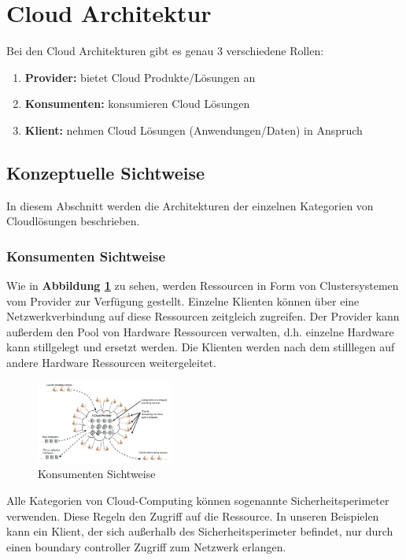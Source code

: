 \section{Cloud Architektur}

Bei den Cloud Architekturen gibt es genau 3 verschiedene Rollen:
\begin{enumerate}
	\item \textbf{Provider:} bietet Cloud Produkte/Lösungen an
	\item \textbf{Konsumenten:} konsumieren Cloud Lösungen
	\item \textbf{Klient:} nehmen Cloud Lösungen
	 (Anwendungen/Daten) in Anspruch
\end{enumerate}

\subsection{Konzeptuelle Sichtweise}

In diesem Abschnitt werden die Architekturen der einzelnen Kategorien von Cloudlösungen beschrieben.

\subsubsection{Konsumenten Sichtweise}

Wie in \textbf{Abbildung \ref{ConsumerView}} zu sehen, werden Ressourcen in Form von Clustersystemen vom Provider zur Verfügung gestellt.
Einzelne Klienten können über eine Netzwerkverbindung auf diese Ressourcen zeitgleich zugreifen. Der Provider kann außerdem den Pool
von Hardware Ressourcen verwalten, d.h. einzelne Hardware kann stillgelegt und ersetzt werden. Die Klienten werden nach dem stilllegen
auf andere Hardware Ressourcen weitergeleitet.
\begin{figure}[H]
    \centering
	\includegraphics[width=0.4\textwidth]{Images/ConsumerView}
	\caption{Konsumenten Sichtweise \cite{Badger}}
	\label{ConsumerView}
\end{figure}


Alle Kategorien von Cloud-Computing können sogenannte Sicherheitsperimeter verwenden. Diese Regeln den Zugriff auf die Ressource.
In unseren Beispielen kann ein Klient, der sich außerhalb des Sicherheitsperimeter befindet, nur durch einen \glqq boundary controller\grqq
Zugriff zum Netzwerk erlangen.

